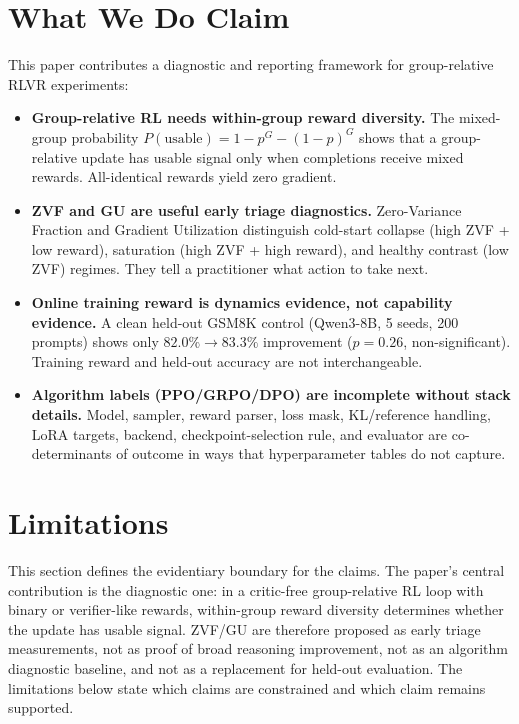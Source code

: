\documentclass{article}
\begin{document}
\section*{What We Do Claim}
\label{sec:what_we_claim}

This paper contributes a diagnostic and reporting framework for group-relative RLVR experiments:

\begin{itemize}
    \item \textbf{Group-relative RL needs within-group reward diversity.} The mixed-group probability $P(\text{usable}) = 1 - p^G - (1-p)^G$ shows that a group-relative update has usable signal only when completions receive mixed rewards. All-identical rewards yield zero gradient.
    \item \textbf{ZVF and GU are useful early triage diagnostics.} Zero-Variance Fraction and Gradient Utilization distinguish cold-start collapse (high ZVF + low reward), saturation (high ZVF + high reward), and healthy contrast (low ZVF) regimes. They tell a practitioner what action to take next.
    \item \textbf{Online training reward is dynamics evidence, not capability evidence.} A clean held-out GSM8K control (Qwen3-8B, 5 seeds, 200 prompts) shows only $82.0\% \to 83.3\%$ improvement ($p=0.26$, non-significant). Training reward and held-out accuracy are not interchangeable.
    \item \textbf{Algorithm labels (PPO/GRPO/DPO) are incomplete without stack details.} Model, sampler, reward parser, loss mask, KL/reference handling, LoRA targets, backend, checkpoint-selection rule, and evaluator are co-determinants of outcome in ways that hyperparameter tables do not capture.
\end{itemize}

\section{Limitations}
\label{sec:limitations}

This section defines the evidentiary boundary for the claims.  The paper's
central contribution is the diagnostic one: in a critic-free group-relative RL
loop with binary or verifier-like rewards, within-group reward diversity
determines whether the update has usable signal.  ZVF/GU are therefore proposed
as early triage measurements, not as proof of broad reasoning improvement, not
as an algorithm diagnostic baseline, and not as a replacement for held-out evaluation.
The limitations below state which claims are constrained and which claim remains
supported.
\end{document}
